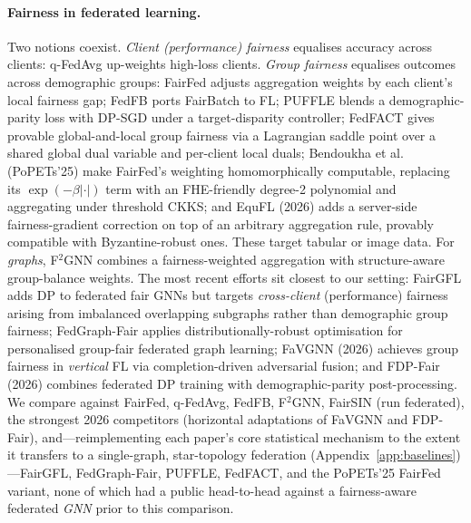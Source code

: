 \paragraph{Fairness in federated learning.}
Two notions coexist. \emph{Client (performance) fairness} equalises accuracy
across clients: q-FedAvg \cite{li2020fair} up-weights high-loss clients.
\emph{Group fairness} equalises outcomes across demographic groups: FairFed
\cite{ezzeldin2023fairfed} adjusts aggregation weights by each client's local
fairness gap; FedFB ports FairBatch to FL; PUFFLE \cite{corbucci2024puffle}
blends a demographic-parity loss with DP-SGD under a target-disparity
controller; FedFACT \cite{fedfact2025} gives provable global-and-local group
fairness via a Lagrangian saddle point over a shared global dual variable and
per-client local duals; Bendoukha et al.\ \cite{bendoukha2025popets}
(PoPETs'25) make FairFed's weighting homomorphically computable, replacing its
$\exp(-\beta|\cdot|)$ term with an FHE-friendly degree-2 polynomial and
aggregating under threshold CKKS; and EquFL \cite{yu2026equfl} (2026) adds a
server-side fairness-gradient correction on top of an arbitrary aggregation
rule, provably compatible with Byzantine-robust ones. These target tabular or
image data. For
\emph{graphs}, F$^2$GNN \cite{f2gnn2023} combines a fairness-weighted
aggregation with structure-aware group-balance weights. The most recent
efforts sit closest to our setting: FairGFL \cite{fairgfl2025} adds DP to
federated fair GNNs but targets \emph{cross-client} (performance) fairness
arising from imbalanced overlapping subgraphs rather than demographic group
fairness; FedGraph-Fair \cite{fedgraphfair2025} applies distributionally-robust
optimisation for personalised group-fair federated graph learning; FaVGNN
\cite{wang2026favgnn} (2026) achieves group fairness in \emph{vertical} FL via
completion-driven adversarial fusion; and FDP-Fair \cite{xue2026fdpfair} (2026)
combines federated DP training with demographic-parity post-processing. We
compare against FairFed, q-FedAvg, FedFB, F$^2$GNN, FairSIN (run federated),
the strongest 2026 competitors (horizontal adaptations of FaVGNN and FDP-Fair),
and---reimplementing each paper's core statistical mechanism to the extent it
transfers to a single-graph, star-topology federation
(Appendix~\ref{app:baselines})---FairGFL, FedGraph-Fair, PUFFLE, FedFACT, and
the PoPETs'25 FairFed variant, none of which had a public head-to-head against
a fairness-aware federated \emph{GNN} prior to this comparison.


